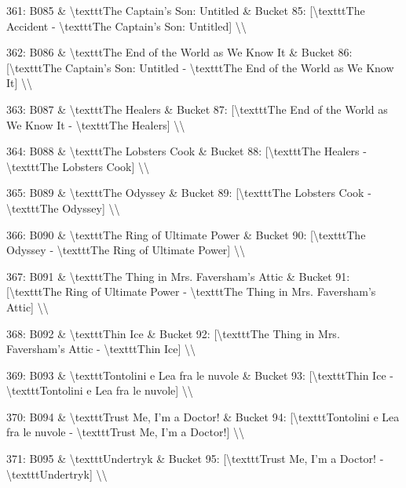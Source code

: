 \documentclass[11pt,a4paper]{article}
\begin{document}
{361: B085 \& \textbackslash{}texttt{The Captain's Son: Untitled} \& Bucket 85: [\textbackslash{}texttt{The Accident} - \textbackslash{}texttt{The Captain's Son: Untitled}] \textbackslash{}\textbackslash{}

362: B086 \& \textbackslash{}texttt{The End of the World as We Know It} \& Bucket 86: [\textbackslash{}texttt{The Captain's Son: Untitled} - \textbackslash{}texttt{The End of the World as We Know It}] \textbackslash{}\textbackslash{}

363: B087 \& \textbackslash{}texttt{The Healers} \& Bucket 87: [\textbackslash{}texttt{The End of the World as We Know It} - \textbackslash{}texttt{The Healers}] \textbackslash{}\textbackslash{}

364: B088 \& \textbackslash{}texttt{The Lobsters Cook} \& Bucket 88: [\textbackslash{}texttt{The Healers} - \textbackslash{}texttt{The Lobsters Cook}] \textbackslash{}\textbackslash{}

365: B089 \& \textbackslash{}texttt{The Odyssey} \& Bucket 89: [\textbackslash{}texttt{The Lobsters Cook} - \textbackslash{}texttt{The Odyssey}] \textbackslash{}\textbackslash{}

366: B090 \& \textbackslash{}texttt{The Ring of Ultimate Power} \& Bucket 90: [\textbackslash{}texttt{The Odyssey} - \textbackslash{}texttt{The Ring of Ultimate Power}] \textbackslash{}\textbackslash{}

367: B091 \& \textbackslash{}texttt{The Thing in Mrs. Faversham's Attic} \& Bucket 91: [\textbackslash{}texttt{The Ring of Ultimate Power} - \textbackslash{}texttt{The Thing in Mrs. Faversham's Attic}] \textbackslash{}\textbackslash{}

368: B092 \& \textbackslash{}texttt{Thin Ice} \& Bucket 92: [\textbackslash{}texttt{The Thing in Mrs. Faversham's Attic} - \textbackslash{}texttt{Thin Ice}] \textbackslash{}\textbackslash{}

369: B093 \& \textbackslash{}texttt{Tontolini e Lea fra le nuvole} \& Bucket 93: [\textbackslash{}texttt{Thin Ice} - \textbackslash{}texttt{Tontolini e Lea fra le nuvole}] \textbackslash{}\textbackslash{}

370: B094 \& \textbackslash{}texttt{Trust Me, I'm a Doctor!} \& Bucket 94: [\textbackslash{}texttt{Tontolini e Lea fra le nuvole} - \textbackslash{}texttt{Trust Me, I'm a Doctor!}] \textbackslash{}\textbackslash{}

371: B095 \& \textbackslash{}texttt{Undertryk} \& Bucket 95: [\textbackslash{}texttt{Trust Me, I'm a Doctor!} - \textbackslash{}texttt{Undertryk}] \textbackslash{}\textbackslash{}

}
\end{document}
